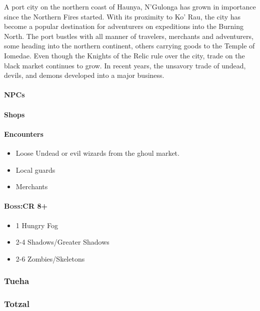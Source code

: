 		A port city on the northern coast of Haunya, N'Gulonga has grown 
		in importance since the Northern Fires started.  With its proximity
		to Ko' Rau, the city has become a popular destination for adventurers
		on expeditions into the Burning North.  The port bustles with all
		manner of travelers, merchants and adventurers, some heading into 
		the northern continent, others carrying goods to the Temple of 
		Iomedae.  Even though the Knights of the Relic rule over the city,
		trade on the black market continues to grow.  In recent years, the 
		unsavory trade of undead, devils, and demons developed into a major 
		business.  

			\paragraph{NPCs}
				
			
			\paragraph{Shops}

			\paragraph{Encounters}
				
				\begin{itemize}
					\item Loose Undead or evil wizards from the 
						ghoul market.
					\item Local guards
					\item Merchants
				\end{itemize}

			\paragraph{\textsc{Boss}:CR 8+}
				\begin{itemize}
					\item 1 Hungry Fog
					\item 2-4 Shadows/Greater Shadows
					\item 2-6 Zombies/Skeletons
				\end{itemize}
			
	
		\subsubsection{Tueha}

		\subsubsection{Totzal}

